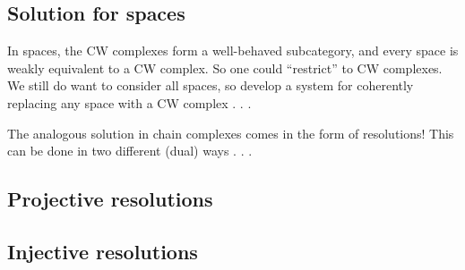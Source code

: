 \documentclass[nooutcomes]{ximera}
\begin{document}
\subsection{Solution for spaces}

In spaces, the CW complexes form a well-behaved subcategory, and every
space is weakly equivalent to a CW complex.  So one could ``restrict''
to CW complexes.  We still do want to consider all spaces, so develop
a system for coherently replacing any space with a CW complex . . .

The analogous solution in chain complexes comes in the form of
resolutions!  This can be done in two different (dual) ways . . .

\subsection{Projective resolutions}



\subsection{Injective resolutions}
\end{document}
